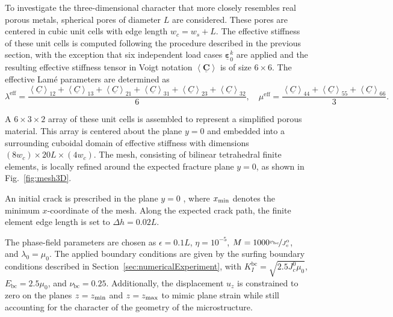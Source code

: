 \documentclass[pdflatex,sn-mathphys-num]{sn-jnl}%
\theoremstyle{thmstyleone}%
\theoremstyle{thmstyletwo}%
\theoremstyle{thmstylethree}%
\begin{document}
To investigate the three-dimensional character that more closely resembles real porous metals, spherical pores of diameter $L$ are considered. These pores are centered in cubic unit cells with edge length $w_c = w_s + L$. The effective stiffness of these unit cells is computed following the procedure described in the previous section, with the exception that six independent load cases $\underline{\boldsymbol{\varepsilon}}_0^k$ are applied and the resulting effective stiffness tensor in Voigt notation 
$\left< \underline{\boldsymbol{C}} \right>$ is of size $6\times6$. The effective Lam\'e parameters are determined as
\begin{equation}
    \lambda^{\text{eff}} = \dfrac{\left< \underline{C} \right>_{12} + \left< \underline{C} \right>_{13} + \left< \underline{C} \right>_{21} + \left< \underline{C} \right>_{31} + \left< \underline{C} \right>_{23} + \left< \underline{C} \right>_{32}}{6}, \quad
    \mu^{\text{eff}} = \dfrac{\left< \underline{C} \right>_{44} + \left< \underline{C} \right>_{55} + \left< \underline{C} \right>_{66}}{3}.
\end{equation}

A $6\times3\times2$ array of these unit cells is assembled to represent a simplified porous material. This array is centered about the plane $y=0$ and embedded into a surrounding cuboidal domain of effective stiffness with dimensions $(8 w_c)\times 20L \times (4 w_c)$.  The mesh, consisting of bilinear tetrahedral finite elements, is locally refined around the expected fracture plane $y=0$, as shown in Fig.~\ref{fig:mesh3D}.

An initial crack is prescribed in the plane $y=0$ , where $x_{\rm min}$ denotes the minimum $x$-coordinate of the mesh. Along the expected crack path, the finite element edge length is set to $\Delta h = 0.02L$.

The phase-field parameters are chosen as $\epsilon = 0.1L$, $\eta = 10^{-5}$, $M = 1000 \nicefrac{v_{\text{bc}}}{J_c^0}$, and $\lambda_0=\mu_0$. The applied boundary conditions are given by the surfing boundary conditions described in Section~\ref{sec:numericalExperiment}, with $K_I^{\text{bc}}=\sqrt{2.5J_c^0\mu_0}$, $E_{\text{bc}}=2.5\mu_0$, and $\nu_{\text{bc}}=0.25$. Additionally, the displacement $u_z$ is constrained to zero on the planes $z=z_{\rm min}$ and 
$z=z_{\rm max}$ to mimic plane strain while still accounting for the  character of the geometry of the microstructure.
\end{document}
